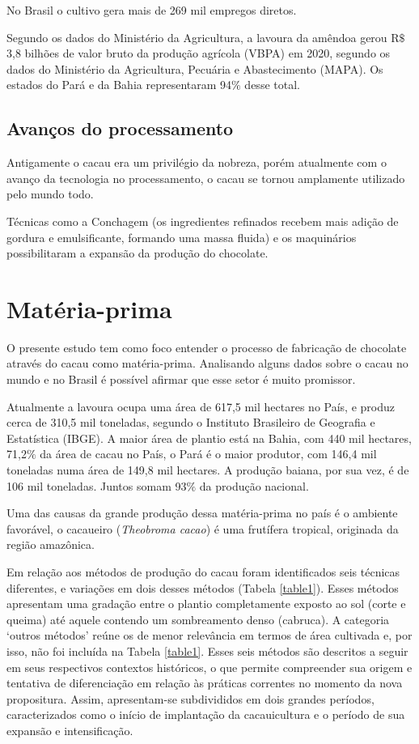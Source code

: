 \documentclass[
	12pt,				%
	openright,			%
	oneside,			%
	a4paper,			%
	english,			%
	french,				%
	spanish,			%
	brazil				%
	]{abntex2}
\begin{document}
No Brasil o cultivo gera mais de 269 mil empregos diretos.

Segundo os dados do Ministério da Agricultura, a lavoura da amêndoa gerou R$\$$ 3,8 bilhões de valor bruto da produção agrícola (VBPA) em 2020, segundo os dados do Ministério da Agricultura, Pecuária e Abastecimento (MAPA). Os estados do Pará e da Bahia representaram 94$\%$ desse total. \cite{8}


\subsection{Avanços do processamento}

Antigamente o cacau era um privilégio da nobreza, porém atualmente com o avanço da tecnologia no processamento, o cacau se tornou amplamente utilizado pelo mundo todo. \cite{9}

Técnicas como a Conchagem (os ingredientes refinados recebem mais adição de gordura e emulsificante, formando uma massa fluida) e os maquinários possibilitaram a expansão da produção do chocolate. \cite{9}

\section{Matéria-prima}

O presente estudo tem como foco entender o processo de fabricação de chocolate através do cacau como matéria-prima. Analisando alguns dados sobre o cacau no mundo e no Brasil é possível afirmar que esse setor é muito promissor.

Atualmente a lavoura ocupa uma área de 617,5 mil hectares no País, e produz cerca de 310,5 mil toneladas, segundo o Instituto Brasileiro de Geografia e Estatística (IBGE). A maior área de plantio está na Bahia, com 440 mil hectares, 71,2$\%$ da área de cacau no País, o Pará é o maior produtor, com 146,4 mil toneladas numa área de 149,8 mil hectares. A produção baiana, por sua vez, é de 106 mil toneladas. Juntos somam 93$\%$ da produção nacional. \cite{6}

Uma das causas da grande produção dessa matéria-prima no país é o ambiente favorável, o cacaueiro (\textit{Theobroma cacao}) é uma frutífera tropical, originada da região amazônica.

Em relação aos métodos de produção do cacau foram identificados seis técnicas diferentes, e variações em dois desses métodos (Tabela \ref{table1}). Esses métodos apresentam uma gradação entre o plantio completamente exposto ao sol (corte e queima) até aquele contendo um sombreamento denso (cabruca). A categoria ‘outros métodos’ reúne os de menor relevância em termos de área cultivada e, por isso, não foi incluída na Tabela \ref{table1}. Esses seis métodos são descritos a seguir em seus respectivos contextos históricos, o que permite compreender sua origem e tentativa de diferenciação em relação às práticas correntes no momento da nova propositura. Assim, apresentam-se subdivididos em dois grandes períodos, caracterizados como o início de implantação da cacauicultura e o período de sua expansão e intensificação. \cite{10}
\end{document}
